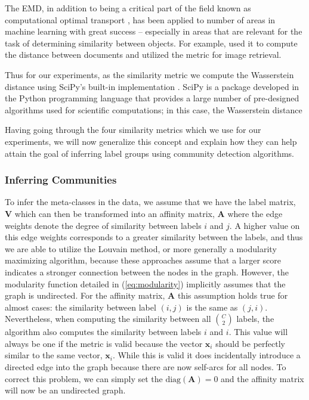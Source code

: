 \documentclass[../thesis.tex]{subfiles}
\begin{document}
The EMD, in addition to being a critical part of the field known as
computational optimal transport \cite{peyre2019computational}, has been applied
to number of areas in machine learning with great success -- especially in areas
that are relevant for the task of determining similarity between objects. For
example, \cite{kusner2015word} used it to compute the distance between documents
and \cite{rubner2000earth} utilized the metric for image retrieval.

Thus for our experiments, as the similarity metric we compute the Wasserstein
distance using SciPy's built-in implementation \cite{scipy}. SciPy is a package
developed in the Python programming language that provides a large number of
pre-designed algorithms used for scientific computations; in this case, the
Wasserstein distance

Having going through the four similarity metrics which we use for our
experiments, we will now generalize this concept and explain how they can help
attain the goal of inferring label groups using community detection algorithms.

\subsubsection{Inferring Communities}
To infer the meta-classes in the data, we assume that we have the label matrix,
$\mathbf{V}$ which can then be transformed into an affinity matrix, $\mathbf{A}$
where the edge weights denote the degree of similarity between labels $i$ and
$j$. A higher value on this edge weights corresponds to a greater similarity
between the labels, and thus we are able to utilize the Louvain method, or more
generally a modularity maximizing algorithm, because these approaches assume
that a larger score indicates a stronger connection between the nodes in the
graph. However, the modularity function detailed in (\ref{eq:modularity})
implicitly assumes that the graph is undirected. For the affinity matrix,
$\mathbf{A}$ this assumption holds true for almost cases: the similarity between
label $(i, j)$ is the same as $(j, i)$. Nevertheless, when computing the
similarity between all $\binom{C}{2}$ labels, the algorithm also computes the
similarity between labels $i$ and $i$. This value will always be one if the
metric is valid because the vector $\mathbf{x}_i$ should be perfectly similar to
the same vector, $\mathbf{x}_i$. While this is valid it does incidentally
introduce a directed edge into the graph because there are now self-arcs for all
nodes. To correct this problem, we can simply set the $\text{diag}(\mathbf{A}) =
0$ and the affinity matrix will now be an undirected graph.
\end{document}
